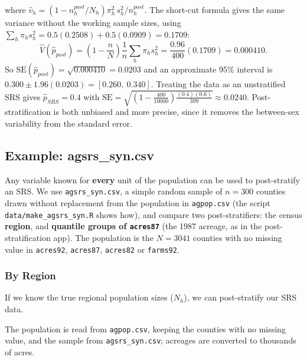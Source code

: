 \documentclass[
  letterpaper,
  DIV=11,
  numbers=noendperiod]{scrreprt}
\renewcommand{\[}{\begin{equation}}
\renewcommand{\]}{\end{equation}}
\begin{document}
where
\(\hat v_h = \left(1 - n_h^{post}/N_h\right)\pi_h^2\,s_h^2/n_h^{post}\).
The short-cut formula gives the same variance without the working sample
sizes, using \(\sum_h\pi_hs_h^2 = 0.5(0.2508) + 0.5(0.0909) = 0.1709\):
\[
\hat V(\hat p_{post}) = \left(1 - \frac nN\right)\frac1n\sum_h\pi_hs_h^2 = \frac{0.96}{400}(0.1709) = 0.000410 .
\] So \(\text{SE}(\hat p_{post}) = \sqrt{0.000410} = 0.0203\) and an
approximate 95\% interval is
\(0.300 \pm 1.96(0.0203) = [0.260,\ 0.340]\). Treating the data as an
unstratified SRS gives \(\hat p_{SRS} = 0.4\) with
\(\text{SE} = \sqrt{\left(1 - \frac{400}{10000}\right)\frac{(0.4)(0.6)}{399}} \approx 0.0240\).
Post-stratification is both unbiased and more precise, since it removes
the between-sex variability from the standard error.

\subsection{Example: agsrs\_syn.csv}\label{example-agsrs_syn.csv}

Any variable known for \textbf{every} unit of the population can be used
to post-stratify an SRS. We use \texttt{agsrs\_syn.csv}, a simple random
sample of \(n=300\) counties drawn without replacement from the
population in \texttt{agpop.csv} (the script
\texttt{data/make\_agsrs\_syn.R} shows how), and compare two
post-stratifiers: the census \textbf{region}, and \textbf{quantile
groups of \texttt{acres87}} (the 1987 acreage, as in the
post-stratification app). The population is the \(N=3041\) counties with
no missing value in \texttt{acres92}, \texttt{acres87}, \texttt{acres82}
or \texttt{farms92}.

\subsubsection{By Region}\label{by-region}

If we know the true regional population sizes (\(N_h\)), we can
post-stratify our SRS data.

The population is read from \texttt{agpop.csv}, keeping the counties
with no missing value, and the sample from \texttt{agsrs\_syn.csv};
acreages are converted to thousands of acres.
\end{document}
